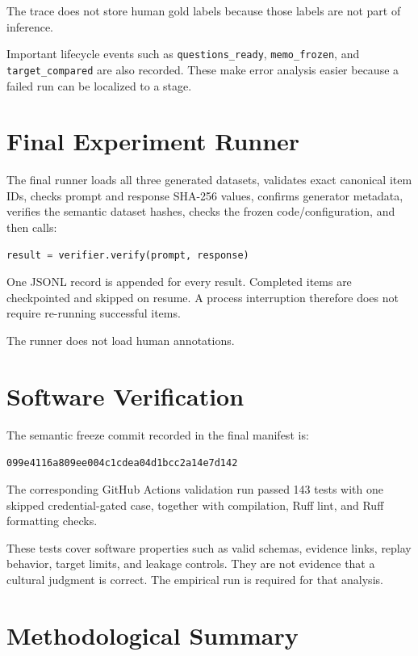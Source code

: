The trace does not store human gold labels because those labels are not part of inference.

Important lifecycle events such as \texttt{questions\_ready}, \texttt{memo\_frozen}, and \texttt{target\_compared} are also recorded. These make error analysis easier because a failed run can be localized to a stage.

\section{Final Experiment Runner}

The final runner loads all three generated datasets, validates exact canonical item IDs, checks prompt and response SHA-256 values, confirms generator metadata, verifies the semantic dataset hashes, checks the frozen code/configuration, and then calls:

\begin{lstlisting}[language=Python,caption={Final evaluation API.}]
result = verifier.verify(prompt, response)
\end{lstlisting}

One JSONL record is appended for every result. Completed items are checkpointed and skipped on resume. A process interruption therefore does not require re-running successful items.

The runner does not load human annotations.

\section{Software Verification}

The semantic freeze commit recorded in the final manifest is:

\begin{center}
\texttt{099e4116a809ee004c1cdea04d1bcc2a14e7d142}
\end{center}

The corresponding GitHub Actions validation run passed 143 tests with one skipped credential-gated case, together with compilation, Ruff lint, and Ruff formatting checks.

These tests cover software properties such as valid schemas, evidence links, replay behavior, target limits, and leakage controls. They are not evidence that a cultural judgment is correct. The empirical run is required for that analysis.

\section{Methodological Summary}

